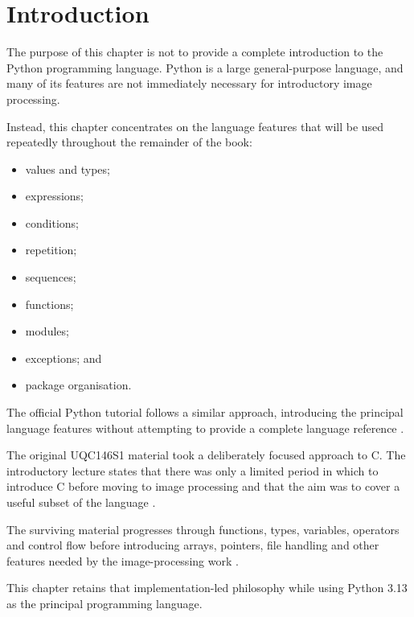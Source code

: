 \section{Introduction}
\label{sec:ch03-introduction}

The purpose of this chapter is not to provide a complete introduction
to the Python programming language. Python is a large general-purpose
language, and many of its features are not immediately necessary for
introductory image processing.

Instead, this chapter concentrates on the language features that will
be used repeatedly throughout the remainder of the book:

\begin{itemize}
    \item values and types;
    \item expressions;
    \item conditions;
    \item repetition;
    \item sequences;
    \item functions;
    \item modules;
    \item exceptions; and
    \item package organisation.
\end{itemize}

The official Python tutorial follows a similar approach, introducing
the principal language features without attempting to provide a
complete language reference \cite{python_tutorial}.

\begin{historicalnote}
The original UQC146S1 material took a deliberately focused approach
to C. The introductory lecture states that there was only a limited
period in which to introduce C before moving to image processing and
that the aim was to cover a useful subset of the language
\cite{johnson_uqc146_intro}.

The surviving material progresses through functions, types,
variables, operators and control flow before introducing arrays,
pointers, file handling and other features needed by the
image-processing work
\cite{johnson_uqc146_intro,johnson_uqc146_c2,
johnson_uqc146_c3}.

This chapter retains that implementation-led philosophy while using
Python 3.13 as the principal programming language.
\end{historicalnote}


